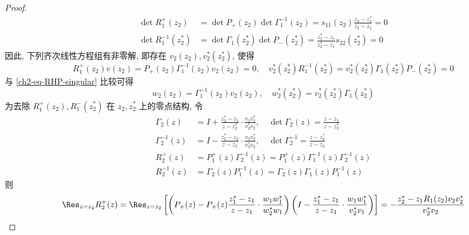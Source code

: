 \begin{proof}
    \begin{equation}
        \begin{aligned}
            \det R_{1}^{+}(z_{2})      & = \det P_{+}(z_{2}) \det \Gamma_{1}^{-1}(z_{2}) = s_{11}(z_{2}) \frac{z_{2} - z_{1}^{*}}{z_{2} - z_{1}} = 0            \\
            \det R_{1}^{-1}(z_{2}^{*}) & = \det \Gamma_{1}(z_{2}^{*}) \det P_{-}(z_{2}^{*}) = \frac{z_{2}^{*} - z_{1}}{z_{2}^{*} - z_{1}} s_{22}(z_{2}^{*}) = 0
        \end{aligned}
    \end{equation}
    因此, 下列齐次线性方程组有非零解, 即存在 $ v_{2}(z_{2}), v_{2}^{*}(z_{2}^{*}) $, 使得
    \begin{equation}
        R_{1}^{+}(z_{2}) v(z_{2}) = P_{+}(z_{2}) \Gamma_{1}^{-1}(z_{2})v_{2}(z_{2}) = 0, \quad v_{2}^{*}(z_{2}^{*}) R_{1}^{-1}(z_{2}^{*}) = v_{2}^{*}(z_{2}^{*}) \Gamma_{1}(z_{2}^{*}) P_{-}(z_{2}^{*}) = 0
    \end{equation}
    与 \eqref{ch2-eq-RHP-singular} 比较可得
    \begin{equation}
        w_{2}(z_{2}) = \Gamma_{1}^{-1}(z_{2}) v_{2}(z_{2}), \quad w_{2}^{*}(z_{2}^{*}) = v_{2}^{*}(z_{2}^{*}) \Gamma_{1}(z_{2}^{*})
    \end{equation}
    为去除 $ R_{1}^{+}(z_{2}), R_{1}^{-}(z_{2}^{*}) $ 在 $ z_{2}, z_{2}^{*} $ 上的零点结构, 令
    \begin{equation}
        \begin{aligned}
            \Gamma_{2}(z)      & = I + \frac{z_{2}^{*} - z_{2}}{z - z_{2}^{*}}\cdot \frac{v_{2}v_{2}^{*}}{v_{2}^{*}v_{2}}, \quad \det \Gamma_{2}(z) = \frac{z - z_{2}}{z - z_{2}^{*}} \\
            \Gamma_{2}^{-1}(z) & = I - \frac{z_{2}^{*} - z_{2}}{z - z_{2}} \cdot \frac{v_{2}v_{2}^{*}}{v_{2}^{*}v_{2}}, \quad  \det \Gamma_{2}^{-1} = \frac{z - z_{2}^{*}}{z - z_{2}} \\
            R_{2}^{+}(z)       & = P_{1}^{+}(z) \Gamma_{2}^{-1}(z) = P_{1}^{+}(z) \Gamma_{1}^{-1}(z) \Gamma_{2}^{-1}(z)                                                               \\
            R_{2}^{-1}(z)      & = \Gamma_{2}(z) P_{1}^{-1}(z) = \Gamma_{2}(z) \Gamma_{1}(z) P_{1}^{-1}(z)
        \end{aligned}
    \end{equation}
    则
    \begin{equation}
        \Res_{z = z_{2}} R_{2}^{+}(z) = \Res_{z = z_{2}} \left[ \left(P_{+}(z) - P_{+}(z) \frac{z_{1}^{*} - z_{1}}{z - z_{1}} \cdot \frac{w_{1}w_{1}^{*}}{w_{2}^{*}w_{1}}\right) \left( I -\frac{z_{1}^{*} - z_{1}}{z - z_{1}} \cdot \frac{w_{1}w_{1}^{*}}{v_{2}^{*}v_{1}} \right)\right] = - \frac{z_{2}^{*} - z_{1}R_{1}(z_{2})v_{2}v_{2}^{*}}{v_{2}^{*}v_{2}}

\end{equation}
\end{proof}
